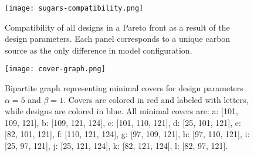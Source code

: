 \begin{figure}[H]
    \centering
    \texttt{[image: sugars-compatibility.png]}
    \caption[Effect of parameters in compatibility distribution]{Compatibility of all designs in a Pareto front as a result of the design parameters. Each panel corresponds to a unique carbon source as the only difference in model configuration.}
    \label{fig7:parameter-scan}
\end{figure}


\begin{figure}[H]
    \centering
    \texttt{[image: cover-graph.png]}
    \caption[Bipartite graph representing minimal covers]{Bipartite graph representing minimal covers for design parameters $\alpha=5$ and $\beta=1$. Covers are colored in red and labeled with letters, while designs are colored in blue.
        All minimal covers are:
            a: [101, 109, 121],
            b: [109, 121, 124],
            c: [101, 110, 121],
            d: [25, 101, 121],
            e: [82, 101, 121],
            f: [110, 121, 124],
            g: [97, 109, 121],
            h: [97, 110, 121],
            i: [25, 97, 121],
            j: [25, 121, 124],
            k: [82, 121, 124],
            l: [82, 97, 121].
            }
    \label{fig7:cover-graph}
\end{figure}
